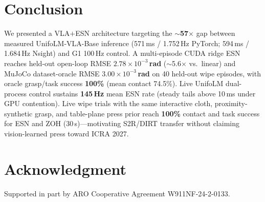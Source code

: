 \documentclass[conference]{IEEEtran}
\begin{document}
\section{Conclusion}
We presented a VLA$+$ESN architecture targeting the \textbf{$\sim$57$\times$} gap between measured UnifoLM-VLA-Base inference (571\,ms / 1.752\,Hz PyTorch; 594\,ms / 1.684\,Hz Nsight) and G1 100\,Hz control.
A multi-episode CUDA ridge ESN reaches held-out open-loop RMSE \textbf{$2.78\times10^{-3}$\,rad} ($\sim$5.6$\times$ vs.\ linear) and MuJoCo dataset-oracle RMSE \textbf{$3.00\times10^{-3}$\,rad} on 40 held-out wipe episodes, with oracle grasp/task success \textbf{100\%} (mean contact 74.5\%).
Live UnifoLM dual-process control sustains \textbf{145\,Hz} mean ESN rate (steady tails above 10\,ms under GPU contention).
Live wipe trials with the same interactive cloth, proximity-synthetic grasp, and table-plane press prior reach \textbf{100\%} contact and task success for ESN and ZOH (30\,s)---motivating S2R/DIRT transfer without claiming vision-learned press toward ICRA 2027.

\section*{Acknowledgment}
Supported in part by ARO Cooperative Agreement W911NF-24-2-0133.



\balance
\end{document}
